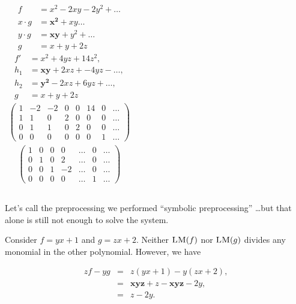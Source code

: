 \documentclass[9pt]{beamer}
\newcommand{\LM}[1]{\ensuremath{\textsc{LM}(#1)\xspace}}
\begin{document}
\begin{frame}
\framebreak

\begin{columns}
\begin{align*}
f &= x^2 - 2xy - 2y^2 + \dots \\
x \cdot g &= \mathbf{x^{2}} + x y \dots\\
y \cdot g &= \mathbf{xy} + y^{2} + \dots\\
g &= x + y + 2z
\end{align*}
\begin{align*}
f' &= x^{2} + 4 y z + 14 z^{2},\\
h_1 &= \mathbf{x y} + 2 x z + -4 y z - \dots,\\
h_2 &= \mathbf{y^{2}} -2 x z + 6 y z + \dots,\\
g &= x + y + 2 z
\end{align*}
\begin{align*}
\left(\begin{array}{rrrrrrrrr}
1 & -2 & -2 & 0 & 0 & 14 & 0 & \dots \\
1 & 1 & 0 & 2 & 0 & 0 & 0 & \dots \\
0 & 1 & 1 & 0 & 2 & 0 & 0 & \dots \\
0 & 0 & 0 & 0 & 0 & 0 & 1 & \dots
\end{array}\right)
\end{align*}
\begin{align*}
\left(\begin{array}{rrrrrrr}
1 & 0 & 0 & 0 & \dots & 0 & \dots \\
0 & 1 & 0 & 2 & \dots & 0 & \dots \\
0 & 0 & 1 & -2 &\dots & 0 & \dots \\
0 & 0 & 0 & 0  &\dots & 1 & \dots
\end{array}\right)
\end{align*}
\end{columns}

\vspace{1em}

Let's call the preprocessing we performed ``symbolic preprocessing'' \dots but that alone is still not enough to solve the system.


\framebreak

Consider $f = yx + 1$ and $g = zx + 2$. Neither $\LM{f}$ nor $\LM{g}$ divides any monomial in the other polynomial. However, we have

\begin{eqnarray*}
zf - yg &=& z(yx + 1) - y(zx + 2),\\
        &=& \mathbf{xyz} + z - \mathbf{xyz} - 2y,\\
        &=& z - 2y.
\end{eqnarray*}


\end{frame}
\end{document}
